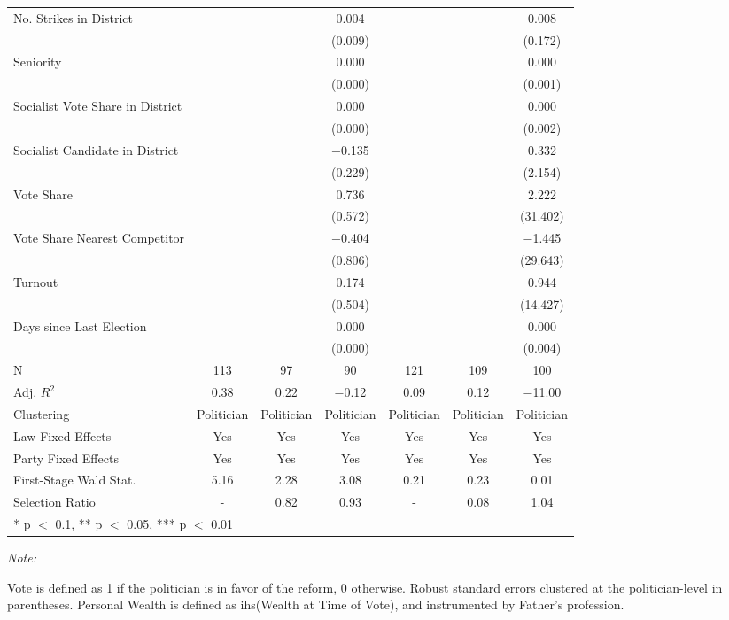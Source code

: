\begin{table}[!h]
{\begin{threeparttable}
\begin{tabular}[t]{lcccccc}
No. Strikes in District &  &  & \num{0.004} &  &  & \num{0.008}\\
 &  &  & (\num{0.009}) &  &  & (\num{0.172})\\
Seniority &  &  & \num{0.000} &  &  & \num{0.000}\\
 &  &  & (\num{0.000}) &  &  & (\num{0.001})\\
Socialist Vote Share in District &  &  & \num{0.000} &  &  & \num{0.000}\\
 &  &  & (\num{0.000}) &  &  & (\num{0.002})\\
Socialist Candidate in District &  &  & \num{-0.135} &  &  & \num{0.332}\\
 &  &  & (\num{0.229}) &  &  & (\num{2.154})\\
Vote Share &  &  & \num{0.736} &  &  & \num{2.222}\\
 &  &  & (\num{0.572}) &  &  & (\num{31.402})\\
Vote Share Nearest Competitor &  &  & \num{-0.404} &  &  & \num{-1.445}\\
 &  &  & (\num{0.806}) &  &  & (\num{29.643})\\
Turnout &  &  & \num{0.174} &  &  & \num{0.944}\\
 &  &  & (\num{0.504}) &  &  & (\num{14.427})\\
Days since Last Election &  &  & \num{0.000} &  &  & \num{0.000}\\
 &  &  & (\num{0.000}) &  &  & (\num{0.004})\\
\midrule
N & \num{113} & \num{97} & \num{90} & \num{121} & \num{109} & \num{100}\\
Adj. $R^2$ & \num{0.38} & \num{0.22} & \num{-0.12} & \num{0.09} & \num{0.12} & \num{-11.00}\\
Clustering & Politician & Politician & Politician & Politician & Politician & Politician\\
Law Fixed Effects & Yes & Yes & Yes & Yes & Yes & Yes\\
Party Fixed Effects & Yes & Yes & Yes & Yes & Yes & Yes\\
First-Stage Wald Stat. & 5.16 & 2.28 & 3.08 & 0.21 & 0.23 & 0.01\\
Selection Ratio & - & 0.82 & 0.93 & - & 0.08 & 1.04\\
\bottomrule
\multicolumn{7}{l}{\rule{0pt}{1em}* p $<$ 0.1, ** p $<$ 0.05, *** p $<$ 0.01}\\
\end{tabular}
\begin{tablenotes}[para]
\item \textit{Note: } 
\item Vote is defined as 1 if the politician is in favor of the reform, 0 otherwise. Robust standard errors clustered at the politician-level in parentheses. Personal Wealth is defined as ihs(Wealth at Time of Vote), and instrumented by Father's profession.
\end{tablenotes}
\end{threeparttable}}
\end{table}
